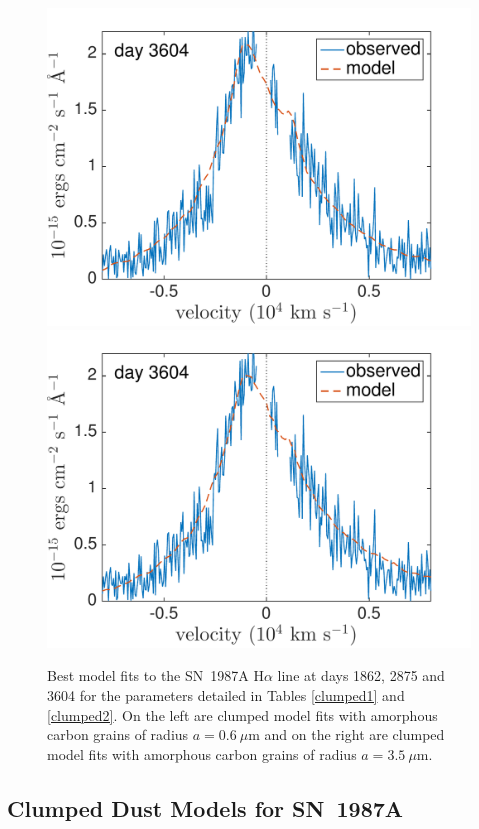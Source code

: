\begin{figure}
\includegraphics[trim =0 0 20 0,clip=true,scale=0.39]{chapters/chapter5/images/clump_1/best_fit/d3604Ha.pdf}
\includegraphics[trim =30 0 0 0,clip=true,scale=0.39]{chapters/chapter5/images/clump_1/maximum/d3604Ha.pdf}
\vspace{8mm}
\caption{Best model fits to the SN~1987A H$\alpha$ line at days 1862, 2875 and 
3604 for the parameters detailed in Tables \ref{clumped1} and \ref{clumped2}. On the left are clumped model fits with amorphous carbon grains of radius $a=0.6~\mu$m and on the right are clumped model fits with amorphous carbon grains of radius $a=3.5~\mu$m.}
\label{d1862_3604}
\end{figure}

\subsection{Clumped Dust Models for SN~1987A}
\label{clumped_models}

